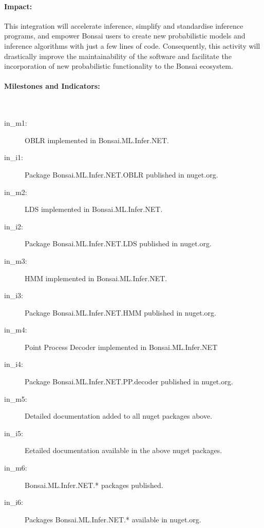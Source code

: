 \paragraph{Impact:}
This integration will accelerate
inference, simplify and standardise inference programs, and empower Bonsai
users to create new probabilistic models and inference algorithms with just a
few lines of code. Consequently, this activity will drastically improve the
maintainability of the software and facilitate the incorporation of new
probabilistic functionality to the Bonsai ecosystem.

\paragraph{Milestones and Indicators:}\mbox{}\\

\begin{description}

    \item[in\_m1:] OBLR implemented in Bonsai.ML.Infer.NET.

    \item[in\_i1:] Package Bonsai.ML.Infer.NET.OBLR published in nuget.org.

    \item[in\_m2:] LDS implemented in Bonsai.ML.Infer.NET.

    \item[in\_i2:] Package Bonsai.ML.Infer.NET.LDS published in nuget.org.

    \item[in\_m3:] HMM implemented in Bonsai.ML.Infer.NET.

    \item[in\_i3:] Package Bonsai.ML.Infer.NET.HMM published in nuget.org.

    \item[in\_m4:] Point Process Decoder implemented in Bonsai.ML.Infer.NET

    \item[in\_i4:] Package Bonsai.ML.Infer.NET.PP.decoder published in
        nuget.org.

    \item[in\_m5:] Detailed documentation added to all nuget packages above.

    \item[in\_i5:] Eetailed documentation available in the above nuget
        packages.

    \item[in\_m6:] Bonsai.ML.Infer.NET.* packages published.
    \item[in\_i6:] Packages Bonsai.ML.Infer.NET.* available in nuget.org.

\end{description}

